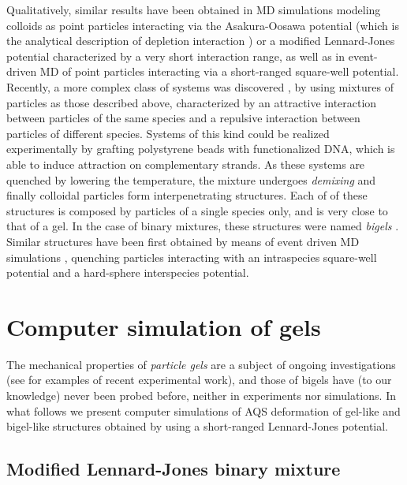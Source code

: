 Qualitatively, similar results have been obtained in MD simulations modeling colloids as point particles interacting via the Asakura-Oosawa potential (which is the analytical description of depletion interaction \cite{likos2001effective}) or a modified Lennard-Jones potential characterized by a very short interaction range\cite{lu2008gelation}, as well as in event-driven MD of point particles interacting via a short-ranged square-well potential. \\
Recently, a more complex class of systems was discovered \cite{varrato2012arrested}, by using mixtures of particles as those described above, characterized by an attractive interaction between particles of the same species and a repulsive interaction between particles of different species. Systems of this kind could be realized experimentally by grafting polystyrene beads with functionalized DNA, which is able to induce attraction on complementary strands. As these systems are quenched by lowering the temperature, the mixture undergoes \emph{demixing} \cite{dorsaz2010phase} and finally colloidal particles form interpenetrating structures. Each of of these structures is composed by particles of a single species only, and is very close to that of a gel. In the case of binary mixtures, these structures were named \emph{bigels} \cite{varrato2012arrested}.
Similar structures have been first obtained by means of event driven MD simulations \cite{varrato2012arrested}, quenching particles interacting with an intraspecies square-well potential and a hard-sphere interspecies potential. 

\section*{Computer simulation of gels}

The mechanical properties of \emph{particle gels} are a subject of ongoing investigations (see \cite{rajaram2010microstructural, sprakel2011stress} for examples of recent experimental work), and those of bigels have (to our knowledge) never been probed before, neither in experiments nor simulations. In what follows we present computer simulations of AQS deformation of gel-like and bigel-like structures obtained by using a short-ranged Lennard-Jones potential.

\subsection*{Modified Lennard-Jones binary mixture}

